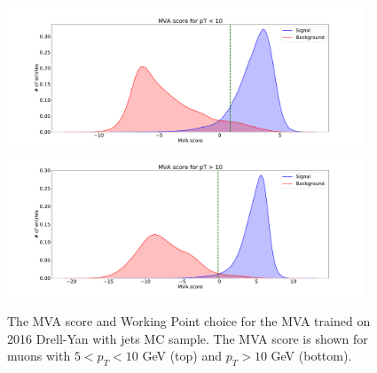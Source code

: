 \begin{figure}[!htb]
   \vspace*{0.3cm}
   \begin{center}
      \includegraphics[width=0.95\textwidth]{Figures/Muons/MVA_score_5_2016.pdf}\\
      \includegraphics[width=0.95\textwidth]{Figures/Muons/MVA_score_10_2016.pdf}
   \caption{The MVA score and Working Point choice for the MVA trained on 2016 Drell-Yan with jets MC sample. The MVA score is shown for muons with
   $5 < p_T < 10 $ GeV (top) and $p_T > 10$ GeV (bottom).}
   \label{fig:mu_MVA_score_2017}
   \end{center}
\end{figure}

